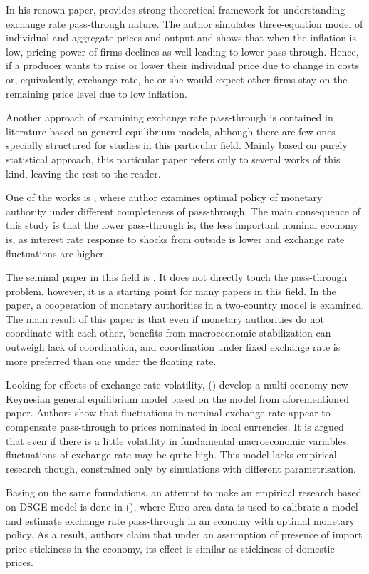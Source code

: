 \documentclass[12pt, a4paper]{extarticle}
\begin{document}
In his renown paper, \textcite{Taylor2000} provides strong theoretical framework for understanding exchange rate pass-through nature. The author simulates three-equation model of individual and aggregate prices and output and shows that when the inflation is low, pricing power of firms declines as well leading to lower pass-through. Hence, if a producer wants to raise or lower their individual price due to change in costs or, equivalently, exchange rate, he or she would expect other firms stay on the remaining price level due to low inflation.
 
Another approach of examining exchange rate pass-through is contained in literature based on general equilibrium models, although there are few ones specially structured for studies in this particular field. Mainly based on purely statistical approach, this particular paper refers only to several works of this kind, leaving the rest to the reader.

One of the works is \cite{Adolfson2001}, where author examines optimal policy of monetary authority under different completeness of pass-through. The main consequence of this study is that the lower pass-through is, the less important nominal economy is, as interest rate response to shocks from outside is lower and exchange rate fluctuations are higher.

The seminal paper in this field is \cite{Obstfeld2002}. It does not directly touch the pass-through problem, however, it is a starting point for many papers in this field. In the paper, a cooperation of monetary authorities in a two-country model is examined. The main result of this paper is that even if monetary authorities do not coordinate with each other, benefits from macroeconomic stabilization can outweigh lack of coordination, and coordination under fixed exchange rate is more preferred than one under the floating rate.

Looking for effects of exchange rate volatility, (\cite{Devereux2002}) develop a multi-economy new-Keynesian general equilibrium model based on the model from aforementioned paper. Authors show that fluctuations in nominal exchange rate appear to compensate pass-through to prices nominated in local currencies. It is argued that even if there is a little volatility in fundamental macroeconomic variables, fluctuations of exchange rate may be quite high. This model lacks empirical research though, constrained only by simulations with different parametrisation.

Basing on the same foundations, an attempt to make an empirical research based on DSGE model is done in (\cite{Smets2002}), where Euro area data is used to calibrate a model and estimate exchange rate pass-through in an economy with optimal monetary policy. As a result, authors claim that under an assumption of presence of import price stickiness in the economy, its effect is similar as stickiness of domestic prices.
\end{document}
